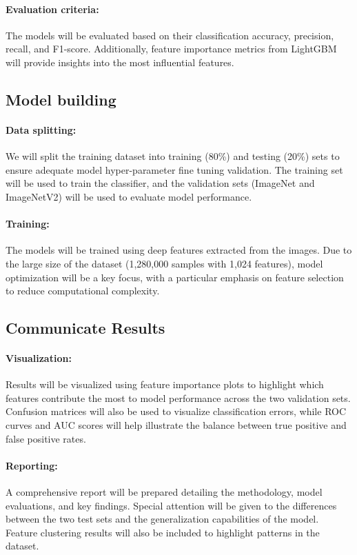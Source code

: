 \documentclass[a4paper,11pt]{article}
\begin{document}
\paragraph{Evaluation criteria:}  
The models will be evaluated based on their classification accuracy, precision, recall, and F1-score. Additionally, feature importance metrics from LightGBM will provide insights into the most influential features.

\subsection{Model building}
\paragraph{Data splitting:}  
We will split the training dataset into training (80\%) and testing (20\%) sets to ensure adequate model hyper-parameter fine tuning validation. The training set will be used to train the classifier, and the validation sets (ImageNet and ImageNetV2) will be used to evaluate model performance.

\paragraph{Training:}  
The models will be trained using deep features extracted from the images. Due to the large size of the dataset (1,280,000 samples with 1,024 features), model optimization will be a key focus, with a particular emphasis on feature selection to reduce computational complexity.

\subsection{Communicate Results}
\paragraph{Visualization:}
Results will be visualized using feature importance plots to highlight which features contribute the most to model performance across the two validation sets. Confusion matrices will also be used to visualize classification errors, while ROC curves and AUC scores will help illustrate the balance between true positive and false positive rates.

\paragraph{Reporting:}  
A comprehensive report will be prepared detailing the methodology, model evaluations, and key findings. Special attention will be given to the differences between the two test sets and the generalization capabilities of the model. Feature clustering results will also be included to highlight patterns in the dataset.
\end{document}
